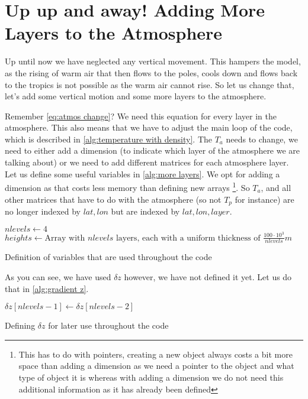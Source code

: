 \section{Up up and away! Adding More Layers to the Atmosphere}
Up until now we have neglected any vertical movement. This hampers the model, as the rising of warm air that then flows to the poles, cools down and flows back to the tropics is not possible
as the warm air cannot rise. So let us change that, let's add some vertical motion and some more layers to the atmosphere.

Remember \autoref{eq:atmos change}? We need this equation for every layer in the atmosphere. This also means that we have to adjust the main loop of the code, which is described  in 
\autoref{alg:temperature with density}. The $T_a$ needs to change, we need to either add a dimension (to indicate which layer of the atmosphere we are talking about) or we need to add different
matrices for each atmosphere layer. Let us define some useful variables in \autoref{alg:more layers}. We opt for adding a dimension as that costs less memory than defining new arrays 
\footnote{This has to do with pointers, creating a new object always costs a bit more space than adding a dimension as we need a pointer to the object and what type of object it is whereas with 
adding a dimension we do not need this additional information as it has already been defined}. So $T_a$, and all other matrices that have to do with the atmosphere (so not $T_p$ for instance) 
are no longer indexed by $lat, lon$ but are indexed by $lat, lon, layer$.

\begin{algorithm}
    $nlevels \leftarrow 4$ \;
    $heights \leftarrow \text{Array with } nlevels \text{ layers, each with a uniform thickness of } \frac{100 \cdot 10^3}{nlevels} m$ \;
    \caption{Definition of variables that are used throughout the code}
    \label{alg:more layers}
\end{algorithm}



As you can see, we have used $\delta z$ however, we have not defined it yet. Let us do that in \autoref{alg:gradient z}.

\begin{algorithm}[hbt]
    $\delta z[nlevels - 1] \leftarrow \delta z [nlevels - 2]$ \;
    \caption{Defining $\delta z$ for later use throughout the code}
    \label{alg:gradient z}
\end{algorithm}

